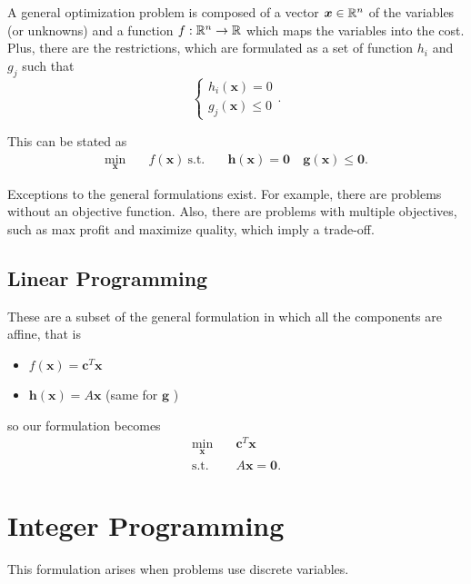\begin{definition}
    A general optimization problem is composed of a vector $\bm{x}\in \mathbb{R}^{n}$ of the variables (or unknowns) and a function $f:\mathbb{R}^{n}\to \mathbb{R}$ which maps the variables into the cost. Plus, there are the restrictions, which are formulated as a set of function $h_i$ and $g_j$ such that \[
	\begin{cases}
	    h_i\left( \bm{x} \right) = 0 \\
	    g_j\left( \bm{x} \right) \le 0
	\end{cases}
    .\] 

    This can be stated as
    \begin{align*}
        \min_{\bm{x}} \quad & f\left( \bm{x} \right) \
        \textrm{s.t.} \quad & \bm{h}\left( \bm{x} \right) = \bm{0} \
          & \bm{g}\left( \bm{x} \right) \le \bm{0}
    .\end{align*}
\end{definition}

Exceptions to the general formulations exist. For example, there are problems without an objective function. Also, there are problems with multiple objectives, such as max profit and maximize quality, which imply a trade-off.

\subsection*{Linear Programming}

These are a subset of the general formulation in which all the components are affine, that is
\begin{itemize}
    \item $f\left( \bm{x} \right) = \bm{c}^{T}\bm{x} $
    \item $\bm{h}\left( \bm{x} \right) = A\bm{x}$ (same for $\bm{g}$ )
\end{itemize}
so our formulation becomes
\begin{align*}
    \min_{\bm{x}} \quad & \bm{c}^{T}\bm{x} \\
    \textrm{s.t.} \quad & A\bm{x} = \bm{0}
.\end{align*}

\section*{Integer Programming}

This formulation arises when problems use discrete variables.

